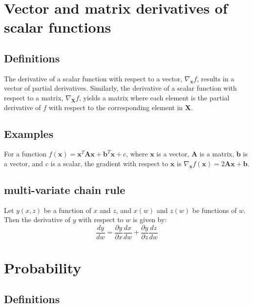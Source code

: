 \documentclass[11pt]{book} %
\begin{document}
\section{Vector and matrix derivatives of scalar functions}

\subsection{Definitions}

The derivative of a scalar function with respect to a vector, \(\nabla_{\mathbf{x}} f\), results in a vector of partial derivatives. Similarly, the derivative of a scalar function with respect to a matrix, \(\nabla_{\mathbf{X}} f\), yields a matrix where each element is the partial derivative of \(f\) with respect to the corresponding element in \(\mathbf{X}\).

\subsection{Examples}

For a function \(f(\mathbf{x}) = \mathbf{x}^T\mathbf{A}\mathbf{x} + \mathbf{b}^T\mathbf{x} + c\), where \(\mathbf{x}\) is a vector, \(\mathbf{A}\) is a matrix, \(\mathbf{b}\) is a vector, and \(c\) is a scalar, the gradient with respect to \(\mathbf{x}\) is \(\nabla_{\mathbf{x}} f(\mathbf{x}) = 2\mathbf{A}\mathbf{x} + \mathbf{b}\).

\subsection{multi-variate chain rule} \label{ssec:chain_rule}
Let $y(x,z)$ be a function of $x$ and $z$, and $x(w)$ and $z(w)$ be functions of $w$. 
Then the derivative of $y$ with respect to $w$ is given by:
\begin{equation}
    \frac{dy}{dw} = \frac{\partial y}{\partial x} \frac{dx}{dw} + \frac{\partial y}{\partial z} \frac{dz}{dw}
\end{equation}

%
%
%

\section{Probability}

\subsection{Definitions}
\end{document}
